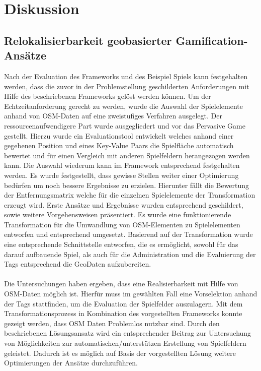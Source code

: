 \chapter{Diskussion}
\label{sec:S7_Diskussion}

\section{Relokalisierbarkeit geobasierter Gamification-Ansätze}

Nach der Evaluation des Frameworks und des Beispiel Spiels kann festgehalten werden, dass die zuvor in der Problemstellung geschilderten Anforderungen mit Hilfe des beschriebenen Frameworks gelöst werden können. Um der Echtzeitanforderung gerecht zu werden, wurde die Auswahl der Spielelemente anhand von OSM-Daten auf eine zweistufiges Verfahren ausgelegt. Der ressourcenaufwendigere Part wurde ausgegliedert und vor das Pervasive Game gestellt. Hierzu wurde ein Evaluationstool entwickelt welches anhand einer gegebenen Position und eines Key-Value Paars die Spielfläche automatisch bewertet und für einen Vergleich mit anderen Spielfeldern herangezogen werden kann.
Die Auswahl wiederum kann im Framework entsprechend festgehalten werden. Es wurde festgestellt, dass gewisse Stellen weiter einer Optimierung bedürfen um noch bessere Ergebnisse zu erzielen. Hierunter fällt die Bewertung der Entfernungsmatrix welche für die einzelnen Spielelemente der Transformation erzeugt wird. Erste Ansätze und Ergebnisse wurden entsprechend geschildert, sowie weitere Vorgehensweisen präsentiert.
Es wurde eine funktionierende Transformation für die Umwandlung von OSM-Elementen zu Spielelementen entworfen und entsprechend umgesetzt.
Basierend auf der Transformation wurde eine entsprechende Schnittstelle entworfen, die es ermöglicht, sowohl für das darauf aufbauende Spiel, als auch für die Administration und die Evaluierung der Tags entsprechend die GeoDaten aufzubereiten.
\\\\
Die Untersuchungen haben ergeben, dass eine Realisierbarkeit mit Hilfe von OSM-Daten möglich ist. Hierfür muss im gewählten Fall eine Vorselektion anhand der Tags stattfinden, um die Evaluation der Spielfelder auszulagern. Mit dem Transformationsprozess in Kombination des vorgestellten Frameworks konnte gezeigt werden, dass OSM Daten Problemlos nutzbar sind. Durch den beschriebenen Lösungsansatz wird ein entsprechender Beitrag zur Untersuchung von Möglichkeiten zur automatischen/unterstützen Erstellung von Spielfeldern geleistet. Dadurch ist es möglich auf Basis der vorgestellten Lösung weitere Optimierungen der Ansätze durchzuführen. 

